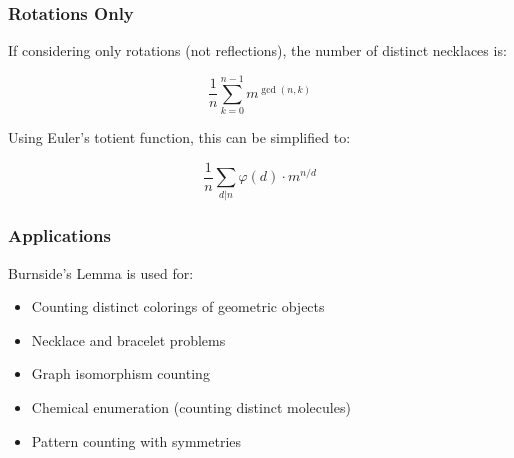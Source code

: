 \subsubsection{Rotations Only}

If considering only rotations (not reflections), the number of distinct necklaces is:

\begin{equation}
    \frac{1}{n} \sum_{k=0}^{n-1} m^{\gcd(n,k)}
\end{equation}

Using Euler's totient function, this can be simplified to:

\begin{equation}
    \frac{1}{n} \sum_{d|n} \varphi(d) \cdot m^{n/d}
\end{equation}

\subsubsection{Applications}

Burnside's Lemma is used for:

\begin{itemize}
    \item Counting distinct colorings of geometric objects
    \item Necklace and bracelet problems
    \item Graph isomorphism counting
    \item Chemical enumeration (counting distinct molecules)
    \item Pattern counting with symmetries
\end{itemize}
